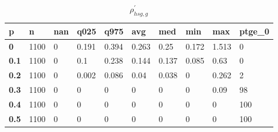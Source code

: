 \begin{table}[h]
 \centering 
\footnotesize
\caption{$\rho_{hsg,g}^\prime $}
\label{tab:alphahsgg}
\begin{tabular}[h]{|l|l|l|l|l|l|l|l|l|l|
    } \hline
\textbf{ p} & \textbf{ n} & \textbf{ nan} & \textbf{ q025} & \textbf{ q975} & \textbf{ avg} & \textbf{ med} & \textbf{ min} & \textbf{ max} & \textbf{ ptge\_0}
    \\ \hline
  \textbf{  0} & 1100 & 0 & 0.191 & 0.394 & 0.263 &  0.25 & 0.172 & 1.513 &   0
    \\ \hline
  \textbf{0.1} & 1100 & 0 &   0.1 & 0.238 & 0.144 & 0.137 & 0.085 &  0.63 &   0
    \\ \hline
  \textbf{0.2} & 1100 & 0 & 0.002 & 0.086 &  0.04 & 0.038 &     0 & 0.262 &   2
    \\ \hline
  \textbf{0.3} & 1100 & 0 &     0 &     0 &     0 &     0 &     0 &  0.09 &  98
    \\ \hline
  \textbf{0.4} & 1100 & 0 &     0 &     0 &     0 &     0 &     0 &     0 & 100
    \\ \hline
  \textbf{0.5} & 1100 & 0 &     0 &     0 &     0 &     0 &     0 &     0 & 100
    \\ \hline
 \end{tabular}
 \end{table}
